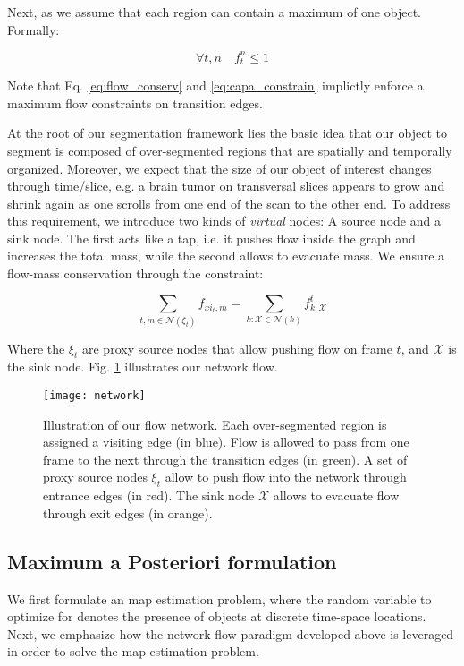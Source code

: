 Next, as we assume that each region can contain a maximum of one object. Formally:

\begin{equation}
  \label{eq:capa_constrain}
  \forall t,n \quad f_{t}^{n} \leq 1
\end{equation}

Note that Eq. \ref{eq:flow_conserv} and \ref{eq:capa_constrain} implictly enforce a maximum flow constraints on transition edges.

At the root of our segmentation framework lies the basic idea that our object to segment is composed of over-segmented regions that are spatially and temporally organized.
Moreover, we expect that the size of our object of interest changes through time/slice, e.g. a brain tumor on transversal slices appears to grow and shrink again as one scrolls from one end of the scan to the other end.
To address this requirement, we introduce two kinds of \textit{virtual} nodes: A source node and a sink node.
The first acts like a tap, i.e. it pushes flow inside the graph and increases the total mass, while the second allows to evacuate mass.
We ensure a flow-mass conservation through the constraint:

\begin{equation}
  \label{eq:mass_constrain}
  \sum_{t,m\in \mathcal{N}(\xi_{t})}f_{xi_{t},m} = \sum_{k:\mathcal{X}\in\mathcal{N}(k)}f^{t}_{k,\mathcal{X}}
\end{equation}

Where the $\xi_{t}$ are proxy source nodes that allow pushing flow on frame $t$, and $\mathcal{X}$ is the sink node.
Fig. \ref{fig:flownetwork} illustrates our network flow.

\begin{figure}[!htpb]
  \centering
  \texttt{[image: network]}
  \caption{Illustration of our flow network. Each over-segmented region is assigned a visiting edge (in blue).
    Flow is allowed to pass from one frame to the next through the transition edges (in green).
    A set of proxy source nodes $\xi_{t}$ allow to push flow into the network through entrance edges (in red).
  The sink node $\mathcal{X}$ allows to evacuate flow through exit edges (in orange).}
  \label{fig:flownetwork}
\end{figure}

\subsection{Maximum a Posteriori formulation}
We first formulate an \gls{map} estimation problem, where the random variable to optimize for denotes the presence of objects at discrete time-space locations.
Next, we emphasize how the network flow paradigm developed above is leveraged in order to solve the \gls{map} estimation problem.

